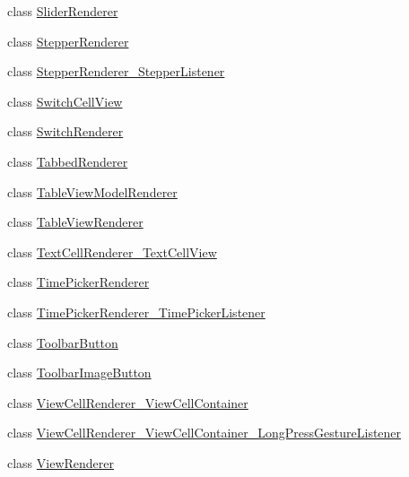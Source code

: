 \begin{CompactItemize}
\item 
class \hyperlink{classmd5b60ffeb829f638581ab2bb9b1a7f4f3f_1_1_slider_renderer}{SliderRenderer}
\item 
class \hyperlink{classmd5b60ffeb829f638581ab2bb9b1a7f4f3f_1_1_stepper_renderer}{StepperRenderer}
\item 
class \hyperlink{classmd5b60ffeb829f638581ab2bb9b1a7f4f3f_1_1_stepper_renderer___stepper_listener}{StepperRenderer\_\-StepperListener}
\item 
class \hyperlink{classmd5b60ffeb829f638581ab2bb9b1a7f4f3f_1_1_switch_cell_view}{SwitchCellView}
\item 
class \hyperlink{classmd5b60ffeb829f638581ab2bb9b1a7f4f3f_1_1_switch_renderer}{SwitchRenderer}
\item 
class \hyperlink{classmd5b60ffeb829f638581ab2bb9b1a7f4f3f_1_1_tabbed_renderer}{TabbedRenderer}
\item 
class \hyperlink{classmd5b60ffeb829f638581ab2bb9b1a7f4f3f_1_1_table_view_model_renderer}{TableViewModelRenderer}
\item 
class \hyperlink{classmd5b60ffeb829f638581ab2bb9b1a7f4f3f_1_1_table_view_renderer}{TableViewRenderer}
\item 
class \hyperlink{classmd5b60ffeb829f638581ab2bb9b1a7f4f3f_1_1_text_cell_renderer___text_cell_view}{TextCellRenderer\_\-TextCellView}
\item 
class \hyperlink{classmd5b60ffeb829f638581ab2bb9b1a7f4f3f_1_1_time_picker_renderer}{TimePickerRenderer}
\item 
class \hyperlink{classmd5b60ffeb829f638581ab2bb9b1a7f4f3f_1_1_time_picker_renderer___time_picker_listener}{TimePickerRenderer\_\-TimePickerListener}
\item 
class \hyperlink{classmd5b60ffeb829f638581ab2bb9b1a7f4f3f_1_1_toolbar_button}{ToolbarButton}
\item 
class \hyperlink{classmd5b60ffeb829f638581ab2bb9b1a7f4f3f_1_1_toolbar_image_button}{ToolbarImageButton}
\item 
class \hyperlink{classmd5b60ffeb829f638581ab2bb9b1a7f4f3f_1_1_view_cell_renderer___view_cell_container}{ViewCellRenderer\_\-ViewCellContainer}
\item 
class \hyperlink{classmd5b60ffeb829f638581ab2bb9b1a7f4f3f_1_1_view_cell_renderer___view_cell_container___long_press_gesture_listener}{ViewCellRenderer\_\-ViewCellContainer\_\-LongPressGestureListener}
\item 
class \hyperlink{classmd5b60ffeb829f638581ab2bb9b1a7f4f3f_1_1_view_renderer}{ViewRenderer}
\item 

\end{CompactItemize}
